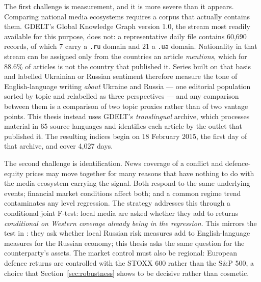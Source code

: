 \documentclass[12pt,a4paper]{article}
\begin{document}
The first challenge is measurement, and it is more severe than it appears. Comparing national media ecosystems requires a corpus that actually contains them. GDELT's Global Knowledge Graph version 1.0, the stream most readily available for this purpose, does not: a representative daily file contains 60,690 records, of which 7 carry a \texttt{.ru} domain and 21 a \texttt{.ua} domain. Nationality in that stream can be assigned only from the countries an article \textit{mentions}, which for 88.6\% of articles is not the country that published it. Series built on that basis and labelled Ukrainian or Russian sentiment therefore measure the tone of English-language writing \textit{about} Ukraine and Russia --- one editorial population sorted by topic and relabelled as three perspectives --- and any comparison between them is a comparison of two topic proxies rather than of two vantage points. This thesis instead uses GDELT's \textit{translingual} archive, which processes material in 65 source languages and identifies each article by the outlet that published it. The resulting indices begin on 18 February 2015, the first day of that archive, and cover 4,027 days.

The second challenge is identification. News coverage of a conflict and defence-equity prices may move together for many reasons that have nothing to do with the media ecosystem carrying the signal. Both respond to the same underlying events; financial market conditions affect both; and a common regime trend contaminates any level regression. The strategy addresses this through a conditional joint F-test: local media are asked whether they add to returns \textit{conditional on Western coverage already being in the regression}. This mirrors the test in \citet{bondarenko2024}: they ask whether local Russian risk measures add to English-language measures for the Russian economy; this thesis asks the same question for the counterparty's assets. The market control must also be regional: European defence returns are controlled with the STOXX 600 rather than the S\&P 500, a choice that Section~\ref{sec:robustness} shows to be decisive rather than cosmetic.
\end{document}
